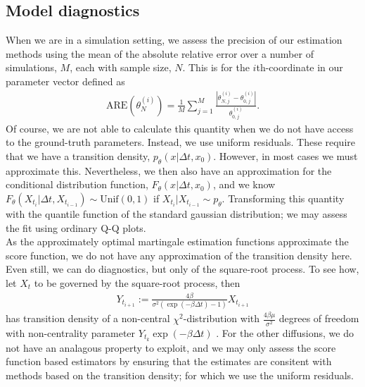 \subsection{Model diagnostics}
When we are in a simulation setting, we assess the precision of our estimation methods using the mean of the absolute relative error over a number of simulations, $M$, each with sample size, $N$. This is for the $i$th-coordinate in our parameter vector defined as
\begin{align}
    \mathrm{ARE}\left(\theta_N^{(i)}\right) = \frac{1}{M}\sum_{j = 1}^M\frac{\left|\theta_{N,j}^{(i)} - \theta_{0,j}^{(i)}\right|}{\theta_{0,j}^{(i)}}.
\end{align}
Of course, we are not able to calculate this quantity when we do not have access to the ground-truth parameters. Instead, we use uniform residuals. These require that we have a transition density, $p_\theta(x|\Delta t, x_0)$. However, in most cases we must approximate this. Nevertheless, we then also have an approximation for the conditional distribution function, $F_\theta(x|\Delta t, x_0)$, and we know $F_\theta(X_{t_{i}}|\Delta t, X_{t_{i - 1}})\sim \mathrm{Unif}(0,1)$ if $X_{t_{i}}|X_{t_{i - 1}} \sim p_\theta$. Transforming this quantity with the quantile function of the standard gaussian distribution; we may assess the fit using ordinary Q-Q plots.\\
As the approximately optimal martingale estimation functions approximate the score function, we do not have any approximation of the transition density here. Even still, we can do diagnostics, but only of the square-root process. To see how, let $X_t$ to be governed by the square-root process, then
\begin{align}
    Y_{t_{i + 1}} := \frac{4\beta}{\sigma^2\left(\exp\left(-\beta \Delta t\right) - 1\right)}X_{t_{i + 1}}
\end{align}
has transition density of a non-central $\chi^2$-distribution with $\frac{4\beta\mu}{\sigma^2}$ degrees of freedom with non-centrality parameter $Y_{t_k}\exp\left(-\beta \Delta t\right)$ \cite[Equation (5.68)]{Srkk2019}. For the other diffusions, we do not have an analagous property to exploit, and we may only assess the score function based estimators by ensuring that the estimates are consitent with methods based on the transition density; for which we use the uniform residuals.